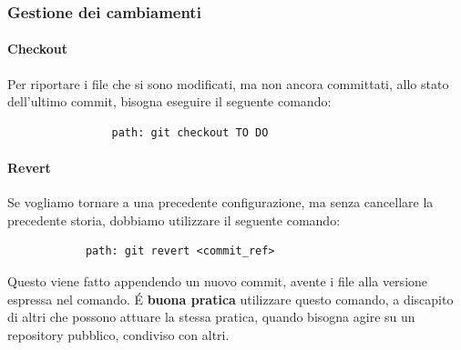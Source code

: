 		
		
		
		
		\subsubsection{Gestione dei cambiamenti} %
		\label{ssub:gestione_dei_cambiamenti}
		
			\paragraph{Checkout} %
			\label{par:checkout}
			Per riportare i file che si sono modificati, ma non ancora committati, allo stato dell'ultimo commit, bisogna eseguire il seguente comando:
				\begin{verbatim}
				path: git checkout TO DO
				\end{verbatim}
				
		
			\paragraph{Revert} %
			\label{par:revert}
			Se vogliamo tornare a una precedente configurazione, ma senza cancellare la precedente storia, dobbiamo utilizzare il seguente comando:
			\begin{verbatim}
			path: git revert <commit_ref>
			\end{verbatim}
			Questo viene fatto appendendo un nuovo commit, avente i file alla versione espressa nel comando. \newline
			\'E \textbf{buona pratica} utilizzare questo comando, a discapito di altri che possono attuare la stessa pratica, quando bisogna agire su un repository pubblico, condiviso con altri.
		
